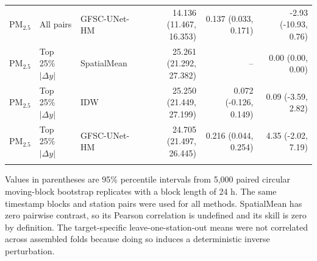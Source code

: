 \begin{table}[t]
\begin{tabular}{lllrrr}
$\mathrm{PM}_{2.5}$ & All pairs & GFSC-UNet-HM & 14.136 (11.467, 16.353) & 0.137 (0.033, 0.171) & -2.93 (-10.93, 0.76) \\
\addlinespace
$\mathrm{PM}_{2.5}$ & Top 25\% $|\Delta y|$ & SpatialMean & 25.261 (21.292, 27.382) & -- & 0.00 (0.00, 0.00) \\
$\mathrm{PM}_{2.5}$ & Top 25\% $|\Delta y|$ & IDW & 25.250 (21.449, 27.199) & 0.072 (-0.126, 0.149) & 0.09 (-3.59, 2.82) \\
$\mathrm{PM}_{2.5}$ & Top 25\% $|\Delta y|$ & GFSC-UNet-HM & 24.705 (21.497, 26.445) & 0.216 (0.044, 0.254) & 4.35 (-2.02, 7.19) \\
\addlinespace
\bottomrule
\end{tabular}
\vspace{2pt}
\parbox{0.98\textwidth}{\footnotesize Values in parentheses are 95\% percentile intervals from 5,000 paired circular moving-block bootstrap replicates with a block length of 24 h. The same timestamp blocks and station pairs were used for all methods. SpatialMean has zero pairwise contrast, so its Pearson correlation is undefined and its skill is zero by definition. The target-specific leave-one-station-out means were not correlated across assembled folds because doing so induces a deterministic inverse perturbation.}
\end{table}
